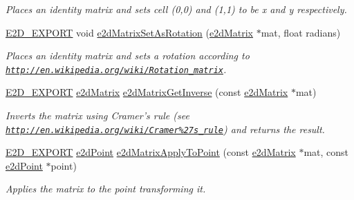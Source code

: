 \begin{DoxyCompactItemize}
\begin{DoxyCompactList}\small\item\em Places an identity matrix and sets cell (0,0) and (1,1) to be x and y respectively. \end{DoxyCompactList}\item 
\hypertarget{group__e2dMatrix_gad90b2706ab6d52d1d1a5c6b0c13b705a}{\hyperlink{Ez2DS_8h_a9f14e9cb869e1a85fdaba03afcca0df9}{E2\-D\-\_\-\-E\-X\-P\-O\-R\-T} void \hyperlink{group__e2dMatrix_gad90b2706ab6d52d1d1a5c6b0c13b705a}{e2d\-Matrix\-Set\-As\-Rotation} (\hyperlink{structe2dMatrix}{e2d\-Matrix} $\ast$mat, float radians)}\label{group__e2dMatrix_gad90b2706ab6d52d1d1a5c6b0c13b705a}

\begin{DoxyCompactList}\small\item\em Places an identity matrix and sets a rotation according to \href{http://en.wikipedia.org/wiki/Rotation_matrix}{\tt http\-://en.\-wikipedia.\-org/wiki/\-Rotation\-\_\-matrix}. \end{DoxyCompactList}\item 
\hyperlink{Ez2DS_8h_a9f14e9cb869e1a85fdaba03afcca0df9}{E2\-D\-\_\-\-E\-X\-P\-O\-R\-T} \hyperlink{structe2dMatrix}{e2d\-Matrix} \hyperlink{group__e2dMatrix_ga4ca036c4990aadcd45df8c54c5859b32}{e2d\-Matrix\-Get\-Inverse} (const \hyperlink{structe2dMatrix}{e2d\-Matrix} $\ast$mat)
\begin{DoxyCompactList}\small\item\em Inverts the matrix using Cramer's rule (see \href{http://en.wikipedia.org/wiki/Cramer%27s_rule}{\tt http\-://en.\-wikipedia.\-org/wiki/\-Cramer\%27s\-\_\-rule}) and returns the result. \end{DoxyCompactList}\item 
\hyperlink{Ez2DS_8h_a9f14e9cb869e1a85fdaba03afcca0df9}{E2\-D\-\_\-\-E\-X\-P\-O\-R\-T} \hyperlink{structe2dPoint}{e2d\-Point} \hyperlink{group__e2dMatrix_ga43bccb37aab28f0eb6f3487f3ce98e9b}{e2d\-Matrix\-Apply\-To\-Point} (const \hyperlink{structe2dMatrix}{e2d\-Matrix} $\ast$mat, const \hyperlink{structe2dPoint}{e2d\-Point} $\ast$point)
\begin{DoxyCompactList}\small\item\em Applies the matrix to the point transforming it. \end{DoxyCompactList}\end{DoxyCompactItemize}


